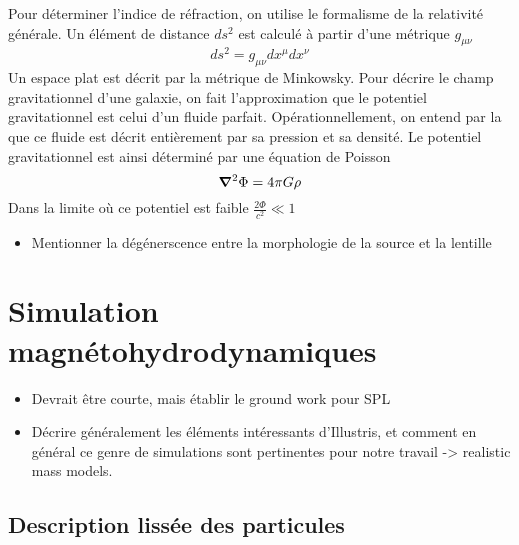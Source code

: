 Pour déterminer l'indice de réfraction, on utilise le formalisme de la relativité 
générale. Un élément de distance $ds^2$ est calculé à partir d'une métrique $g_{\mu \nu}$ 
\begin{equation}\label{eq:ds}
        ds^2 = g_{\mu \nu}dx^{\mu}dx^{\nu}
\end{equation} 
Un espace plat est décrit par la métrique de Minkowsky. Pour décrire le champ 
gravitationnel d'une galaxie, on fait l'approximation que le potentiel gravitationnel 
est celui d'un fluide parfait. Opérationnellement, on entend par la que ce fluide est décrit entièrement 
par sa pression et sa densité. Le potentiel gravitationnel est ainsi déterminé 
par une équation de Poisson 
\begin{equation}\label{eq:Poisson}
       \grad^{2}\Phi = 4\pi G \rho 
\end{equation} 
Dans la limite où ce potentiel est faible $\displaystyle \frac{2\Phi}{c^{2}} \ll 1$
\begin{itemize}
        \item Mentionner la dégénerscence entre la morphologie de la source et la 
                lentille
\end{itemize}

\section{Simulation magnétohydrodynamiques}\label{sec:simulation magnetohydrodynamique}
\begin{itemize}
        \item Devrait être courte, mais établir le ground work pour 
                SPL
        \item Décrire généralement les éléments intéressants d'Illustris, et
                comment en général ce genre de simulations sont pertinentes 
                pour notre travail -> realistic mass models.
\end{itemize}
\subsection{Description lissée des particules}

